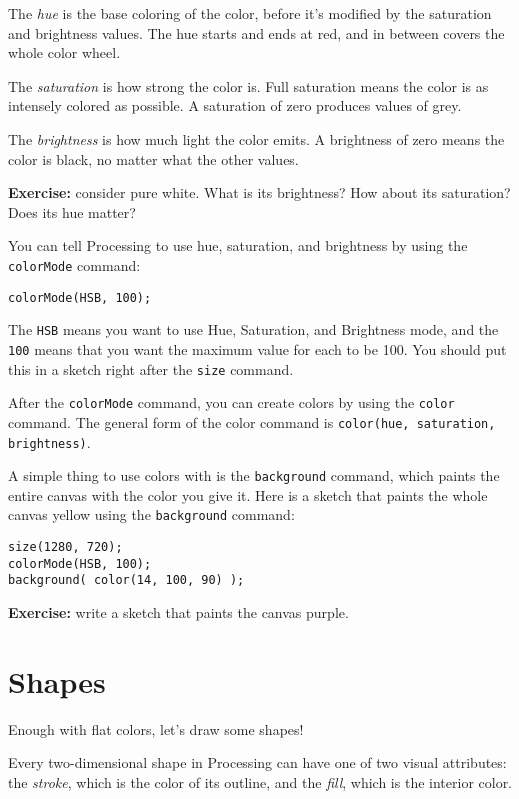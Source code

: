 \documentclass[
]{leaflet}
\begin{document}
The \textit{hue} is the base coloring of the color, before it's modified by the saturation and brightness values.
The hue starts and ends at red, and in between covers the whole color wheel.

The \textit{saturation} is how strong the color is.
Full saturation means the color is as intensely colored as possible.
A saturation of zero produces values of grey.

The \textit{brightness} is how much light the color emits.
A brightness of zero means the color is black, no matter what the other values.

\textbf{Exercise:} consider pure white. What is its brightness? How about its saturation? Does its hue matter?

You can tell Processing to use hue, saturation, and brightness by using the \texttt{colorMode} command:

\begin{lstlisting}
colorMode(HSB, 100);
\end{lstlisting}

The \texttt{HSB} means you want to use Hue, Saturation, and Brightness mode, and the \texttt{100} means that you want the maximum value for each to be 100.
You should put this in a sketch right after the \texttt{size} command.

After the \texttt{colorMode} command, you can create colors by using the \texttt{color} command.
The general form of the color command is \texttt{color(hue, saturation, brightness)}.

A simple thing to use colors with is the \texttt{background} command, which paints the entire canvas with the color you give it.
Here is a sketch that paints the whole canvas yellow using the \texttt{background} command:

\begin{lstlisting}
size(1280, 720);
colorMode(HSB, 100);
background( color(14, 100, 90) );
\end{lstlisting}

\textbf{Exercise:} write a sketch that paints the canvas purple.

\vbox{}

\section{Shapes}

Enough with flat colors, let's draw some shapes!

Every two-dimensional shape in Processing can have one of two visual attributes: the \textit{stroke}, which is the color of its outline, and the \textit{fill}, which is the interior color.
\end{document}
